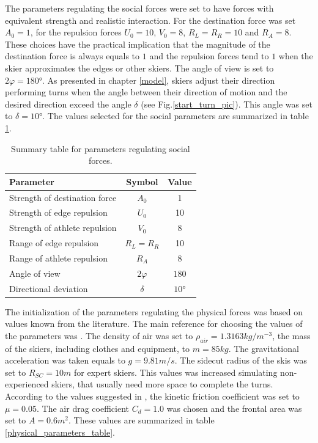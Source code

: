 \documentclass[12pt,a4paper,twoside]{book}
\begin{document}
The parameters regulating the social forces were set to have forces with equivalent strength and realistic interaction. For the destination force was set $A_0=1$, for the repulsion forces $U_0=10$, $V_0=8$, $R_L=R_R=10$ and $R_A=8$. These choices have the practical implication that the magnitude of the destination force is always equals to $1$ and the repulsion forces tend to $1$ when the skier approximates the edges or other skiers. The angle of view is set to $2\varphi=180°$. As presented in chapter \ref{model}, skiers adjust their direction performing turns when the angle between their direction of motion and the desired direction exceed the angle $\delta$ (see Fig.\ref{start_turn_pic}). This angle was set to $\delta=10°$. The values selected for the social parameters are summarized in table \ref{social_parameters_table}.

\begin{table}
  \centering
  \begin{tabular}{ l | c | c }
    \hline
    Parameter & Symbol & Value \\
    \hline
    Strength of destination force & $A_0$ & 1 \\
    Strength of edge repulsion & $U_0$ & 10 \\
    Strength of athlete repulsion & $V_0$ & 8 \\
    Range of edge repulsion & $R_L=R_R$ & 10 \\
    Range of athlete repulsion & $R_A$ & 8 \\
    Angle of view & $2\varphi$ & $180$ \\
    Directional deviation & $\delta$ & $10°$ \\
    \hline
  \end{tabular}
  \caption{Summary table for parameters regulating social forces.}
  \label{social_parameters_table}
\end{table}

The initialization of the parameters regulating the physical forces was based on values known from the literature. The main reference for choosing the values of the parameters was \cite{hol2012}. The density of air was set to $\rho_{air}=1.3163 kg/m^{-3}$, the mass of the skiers, including clothes and equipment, to $m=85 kg$. The gravitational acceleration was taken equals to $g=9.81 m/s$. The sidecut radius of the skis was set to $R_{SC}=10 m$ for expert skiers. This values was increased simulating non-experienced skiers, that usually need more space to complete the turns. According to the values suggested in \cite{bu2004}, the kinetic friction coefficient was set to $\mu = 0.05$. The air drag coefficient $C_d = 1.0$ was chosen and the frontal area was set to $A=0.6 m^2$. These values are summarized in table \ref{physical_parameters_table}.
\end{document}
